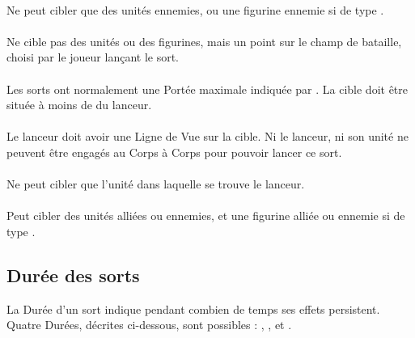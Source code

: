 \paragraph{\hex}

Ne peut cibler que des unités ennemies, ou une figurine ennemie si de type \focused{}.

\paragraph{\ground}

Ne cible pas des unités ou des figurines, mais un point sur le champ de bataille, choisi par le joueur lançant le sort.

\paragraph{}

Les sorts ont normalement une Portée maximale indiquée par \og {} \fg{}. La cible doit être située à moins de  du lanceur.

\paragraph{\missile}

Le lanceur doit avoir une Ligne de Vue sur la cible. Ni le lanceur, ni son unité ne peuvent être engagés au Corps à Corps pour pouvoir lancer ce sort.

\paragraph{\castersunit}

Ne peut cibler que l'unité dans laquelle se trouve le lanceur.

\paragraph{\universal}

Peut cibler des unités alliées ou ennemies, et une figurine alliée ou ennemie si de type \focused{}.


\subsection{Durée des sorts}

La Durée d'un sort indique pendant combien de temps ses effets persistent. Quatre Durées, décrites ci-dessous, sont possibles : \lastsoneturn{}, \instant{}, \permanent{} et \remainsinplay{}.

